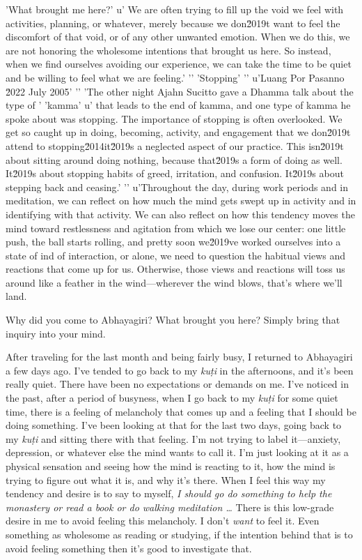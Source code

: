 'What brought me here?'
u' We are often trying to fill up the void we feel with activities, planning, or whatever, merely because we don\u2019t want to feel the discomfort of that void, or of any other unwanted emotion. When we do this, we are not honoring the wholesome intentions that brought us here. So instead, when we find ourselves avoiding our experience, we can take the time to be quiet and be willing to feel what we are feeling.'
'\n'
'Stopping'
'\n'
u'Luang Por Pasanno \u2022 July 2005'
'\n'
'The other night Ajahn Sucitto gave a Dhamma talk about the type of '
'kamma'
u' that leads to the end of kamma, and one type of kamma he spoke about was stopping. The importance of stopping is often overlooked. We get so caught up in doing, becoming, activity, and engagement that we don\u2019t attend to stopping\u2014it\u2019s a neglected aspect of our practice. This isn\u2019t about sitting around doing nothing, because that\u2019s a form of doing as well. It\u2019s about stopping habits of greed, irritation, and confusion. It\u2019s about stepping back and ceasing.'
'\n'
u'Throughout the day, during work periods and in meditation, we can reflect on how much the mind gets swept up in activity and in identifying with that activity. We can also reflect on how this tendency moves the mind toward restlessness and agitation from which we lose our center: one little push, the ball starts rolling, and pretty soon we\u2019ve worked ourselves into a state of ind of 
interaction, or alone, we need to question the habitual views and 
reactions that come up for us. Otherwise, those views and reactions 
will toss us around like a feather in the wind---wherever the wind 
blows, that's where we'll land.


Why did you come to Abhayagiri? What brought you here? Simply bring 
that inquiry into your mind.

After traveling for the last month and being fairly busy, I returned to 
Abhayagiri a few days ago. I've tended to go back to my \emph{kuṭi} 
in the afternoons, and it's been really quiet. There have been no 
expectations or demands on me. I've noticed in the past, after a period 
of busyness, when I go back to my \emph{kuṭi} for some quiet time, 
there is a feeling of melancholy that comes up and a feeling that I 
should be doing something. I've been looking at that for the last two 
days, going back to my \emph{kuṭi} and sitting there with that 
feeling. I'm not trying to label it---anxiety, depression, or whatever 
else the mind wants to call it. I'm just looking at it as a physical 
sensation and seeing how the mind is reacting to it, how the mind is 
trying to figure out what it is, and why it's there. When I feel this 
way my tendency and desire is to say to myself, \emph{I should go do 
something to help the monastery or read a book or do walking meditation 
\ldots{}} There is this low-grade desire in me to avoid feeling this 
melancholy. I don't \emph{want} to feel it. Even something as wholesome 
as reading or studying, if the intention behind that is to avoid 
feeling something then it's good to investigate that.

